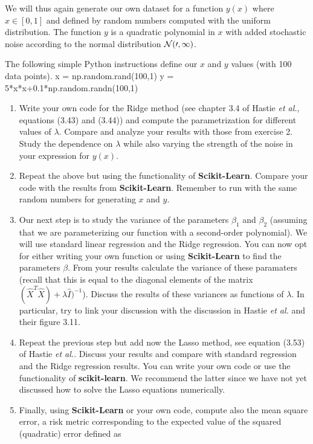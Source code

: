 \documentclass[%
oneside,                 %
final,                   %
10pt]{article}
\begin{document}
We will thus again generate our own dataset for a function $y(x)$ where 
$x \in [0,1]$ and defined by random numbers computed with the uniform
distribution. The function $y$ is a quadratic polynomial in $x$ with
added stochastic noise according to the normal distribution $\cal{N}(0,1)$.

The following simple Python instructions define our $x$ and $y$ values (with 100 data points).
\bpycod
x = np.random.rand(100,1)
y = 5*x*x+0.1*np.random.randn(100,1)
\epycod

\begin{enumerate}
\item Write your own code for the Ridge method (see chapter 3.4 of Hastie \emph{et al.}, equations (3.43) and (3.44)) and compute the parametrization for different values of $\lambda$. Compare and analyze your results with those from exercise 2. Study the dependence on $\lambda$ while also varying the strength of the noise in your expression for $y(x)$. 

\item Repeat the above but using the functionality of \textbf{Scikit-Learn}. Compare your code with the results from \textbf{Scikit-Learn}. Remember to run with the same random numbers for generating $x$ and $y$. 

\item Our next step is to study the variance of the parameters $\beta_1$ and $\beta_2$ (assuming that we are parameterizing our function with a second-order polynomial). We will use standard linear regression and the Ridge regression.  You can now opt for either writing your own function or using \textbf{Scikit-Learn} to find the parameters $\beta$. From your results calculate the variance of these paramaters (recall that this is equal to the diagonal elements of the matrix $(\hat{X}^T\hat{X})+\lambda\hat{I})^{-1}$). Discuss the results of these variances as functions of $\lambda$. In particular, try to link your discussion with the discussion in Hastie \emph{et al.} and their figure 3.11.

\item Repeat the previous step but add now the Lasso method, see equation (3.53) of Hastie \emph{et al.}. Discuss your results and compare with standard regression and the Ridge regression results. You can write your own code or use the functionality of \textbf{scikit-learn}.  We recommend the latter since we have not yet discussed how to solve the Lasso equations numerically.

\item Finally, using \textbf{Scikit-Learn} or your own code, compute also the mean square error, a risk metric corresponding to the expected value of the squared (quadratic) error defined as
\end{enumerate}
\end{document}
